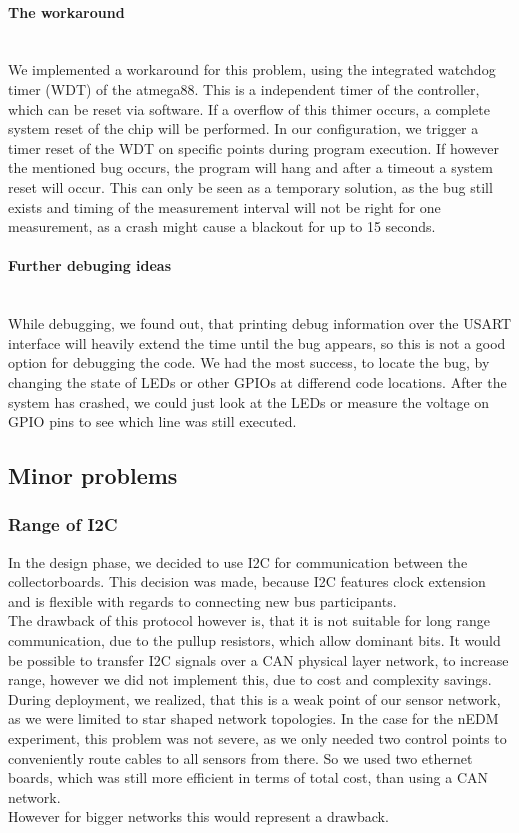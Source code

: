 \documentclass[a4paper]{scrreprt}
\begin{document}
\paragraph{The workaround}\hspace{1cm}\\
We implemented a workaround for this problem, using the integrated watchdog
timer (WDT) of the atmega88. This is a independent timer of the
controller, which can be reset via software. If a overflow of this thimer occurs,
a complete system reset of the chip will be performed. In our configuration, we
trigger a timer reset of the WDT on specific points during program execution.
If however the mentioned bug occurs, the program will hang and after a timeout
a system reset will occur. This can only be seen as a temporary solution, as
the bug still exists and timing of the measurement interval will not be right
for one measurement, as a crash might cause a blackout for up to 15 seconds.
\paragraph{Further debuging ideas}\hspace{1cm}\\
While debugging, we found out, that printing debug information over the USART
interface will heavily extend the time until the bug appears, so this is not a
good option for debugging the code. We had the most success, to locate the bug,
by changing the state of LEDs or other GPIOs at differend code locations. After
the system has crashed, we could just look at the LEDs or measure the voltage on
GPIO pins to see which line was still executed.
\subsection{Minor problems}
\subsubsection{Range of I2C}
In the design phase, we decided to use I2C for communication between
the collectorboards. This decision was made, because I2C features clock
extension and is flexible with regards to connecting new bus participants.\\
The drawback of this protocol however is, that it is not suitable for long
range communication, due to the pullup resistors, which allow dominant
bits. It would be possible to transfer I2C signals over a CAN physical layer
network, to increase range, however we did not implement this, due to
cost and complexity savings.\\
During deployment, we realized, that this is a weak point of our sensor
network, as we were limited to star shaped network topologies. In the case
for the nEDM experiment, this problem was not severe, as we only needed
two control points to conveniently route cables to all sensors from there.
So we used two ethernet boards, which was still more efficient in terms
of total cost, than using a CAN network.\\
However for bigger networks this would represent a drawback.
\end{document}
